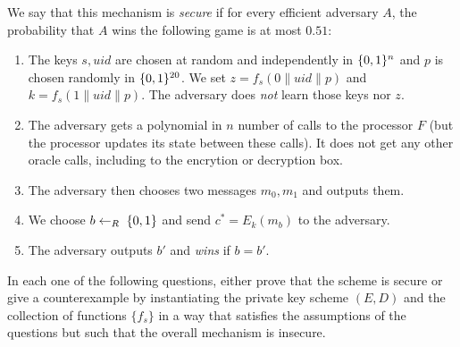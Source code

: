 \documentclass{article}
\begin{document}
We say that this mechanism is \emph{secure} if for every efficient adversary $A$,  the probability that $A$ wins the following game is at most $0.51$:%

\begin{enumerate}[noitemsep,topsep=\mdcompacttopsep]%

\item{}The keys $s,uid$ are chosen at random and independently in $\{0,1\}^n$ and $p$ is chosen randomly in $\{0,1\}^{20}$. We set $z=f_s(0\|uid\|p)$ and $k=f_s(1\|uid\|p)$. The adversary does \emph{not} learn those keys nor $z$.%

\item{}The adversary gets a polynomial in $n$ number of calls to the processor $F$ (but the processor updates its state between these calls). It does not get any other oracle calls, including to the encrytion or decryption box.%

\item{}The adversary then chooses two messages $m_0,m_1$ and outputs them.%

\item{}We choose $b\leftarrow_R\; \{0,1\}$ and send $c^* = E_k(m_b)$ to the adversary.%

\item{}The adversary outputs $b'$ and \emph{wins} if $b=b'$.%
\end{enumerate}%

\noindent{}In each one of the following questions, either prove that the scheme is secure or give a counterexample by instantiating the private key scheme $(E,D)$ and the collection of functions $\{ f_s \}$ in a way that satisfies the assumptions of the questions but such that the overall mechanism is insecure.%
\end{document}
